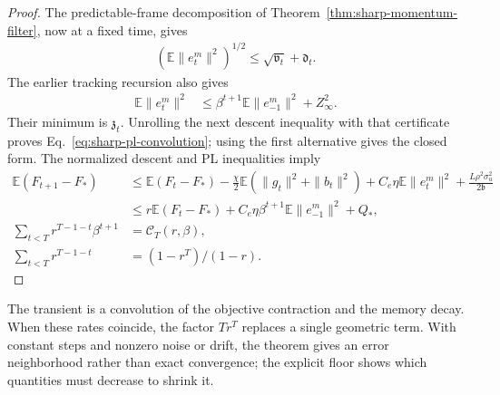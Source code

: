 \begin{proof}
The predictable-frame decomposition of Theorem~\ref{thm:sharp-momentum-filter}, now at a fixed time, gives
\begin{align}
 (\mathbb E\|e_t^m\|^2)^{1/2}\le\sqrt{\mathfrak v_t}+\mathfrak d_t.
\end{align}
The earlier tracking recursion also gives
\begin{align}
 \mathbb E\|e_t^m\|^2
 &\le\beta^{t+1}\mathbb E\|e_{-1}^m\|^2+Z_\infty^2.
\end{align}
Their minimum is $\mathfrak z_t$. Unrolling the next descent inequality with that certificate proves Eq.~\eqref{eq:sharp-pl-convolution}; using the first alternative gives the closed form.
The normalized descent and PL inequalities imply
\begin{align}
 \mathbb E(F_{t+1}-F_*)
 &\le\mathbb E(F_t-F_*)-
 \frac\chi2\mathbb E(\|g_t\|^2+\|b_t\|^2)
 +C_e\eta\mathbb E\|e_t^m\|^2+
 \frac{L\rho^2\sigma_u^2}{2\mathfrak b}\\
 &\le r\mathbb E(F_t-F_*)+
 C_e\eta\beta^{t+1}\mathbb E\|e_{-1}^m\|^2+Q_*,\\
 \sum_{t<T}r^{T-1-t}\beta^{t+1}&=\mathcal C_T(r,\beta),\\
 \sum_{t<T}r^{T-1-t}&=(1-r^T)/(1-r).
\end{align}
\end{proof}

The transient is a convolution of the objective contraction and the memory decay. When these rates coincide, the factor $Tr^T$ replaces a single geometric term. With constant steps and nonzero noise or drift, the theorem gives an error neighborhood rather than exact convergence; the explicit floor shows which quantities must decrease to shrink it.

